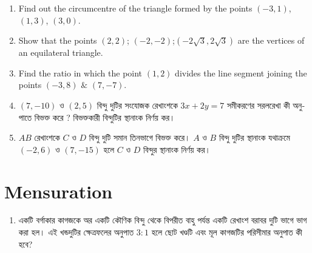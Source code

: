 \documentclass[11pt, a4paper]{article}
\begin{document}
\begin{enumerate}


	\item Find out the circumcentre of the triangle formed by the points $(-3,1)$, $(1,3)$, $(3,0)$.
	
	\item Show that the points $ (2,2) $; $(-2,-2)$;$(-2\sqrt{3},2\sqrt{3})$ are the vertices of an equilateral triangle.
	
	\item Find the ratio in which the point $(1,2)$ divides the line segment joining the points $(-3,8)$ $\&$ $(7,-7)$.
	
	\item $(7, -10)$ \textbengali{ও} $(2, 5)$  \textbengali{বিন্দু দুটির সংযোজক রেখাংশকে}  $3x + 2y = 7$ \textbengali{সমীকরণের সরলরেখা কী অনুপাতে বিভক্ত করে ? বিভক্তকারী বিন্দুটির স্থানাংক নির্ণয় কর।}
	
	\item $AB$ \textbengali{রেখাংশকে} $C$ \textbengali{ও} $D$ \textbengali{বিন্দু দুটি সমান তিনভাগে বিভক্ত করে।} $A$ \textbengali{ও} $B$ \textbengali{বিন্দু দুটির স্থানাংক যথাক্রমে} $(-2, 6)$ \textbengali{ও} $(7, -15)$ \textbengali{হলে} $C$ \textbengali{ও} $D$ \textbengali{বিন্দুর স্থানাংক নির্ণয় কর।}

\end{enumerate}



\section{Mensuration}

\begin{enumerate}

	\item \textbengali{একটি বর্গাকার কাগজকে অর একটি কৌণিক বিন্দু থেকে বিপরীত বাহু পর্যন্ত একটি রেখাংশ বরাবর দুটি ভাগে ভাগ করা হল। এই খন্ডদুটির ক্ষেত্রফলের অনুপাত} $3:1$ \textbengali{হলে ছোট খণ্ডটি এবং মূল কাগজটির পরিসীমার অনুপাত কী হবে?}
\end{enumerate}
\end{document}
